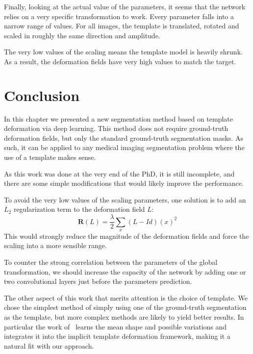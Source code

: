 Finally, looking at the actual value of the parameters, it seems that the network relies on a very specific transformation to work. Every parameter falls into a narrow range of values. For all images, the template is translated, rotated and scaled in roughly the same direction and amplitude. 

The very low values of the scaling means the template model is heavily shrunk. As a result, the deformation fields have very high values to match the target. %



\section{Conclusion}

In this chapter we presented a new segmentation method based on template deformation via deep learning. This method does not require ground-truth deformation fields, but only the standard ground-truth segmentation masks. As such, it can be applied to any medical imaging segmentation problem where the use of a template makes sense.

As this work was done at the very end of the PhD, it is still incomplete, and there are some simple modifications that would likely improve the performance. 

To avoid the very low values of the scaling parameters, one solution is to add an $L_2$ regularization term to the deformation field $L$:
\begin{equation}
    \mathbf{R} \left( L \right) = \frac{\lambda}{2} \sum_x \left( L - Id \right)(x)^2
\end{equation}
This would strongly reduce the magnitude of the deformation fields and force the scaling into a more sensible range. 

To counter the strong correlation between the parameters of the global transformation, we should increase the capacity of the network by adding one or two convolutional layers just before the parameters prediction.

The other aspect of this work that merits attention is the choice of template. We chose the simplest method of simply using one of the ground-truth segmentation as the template, but more complex methods are likely to yield better results. In particular the work of~\textcite{prevost2013PHD} learns the mean shape and possible variations and integrates it into the implicit template deformation framework, making it a natural fit with our approach.
